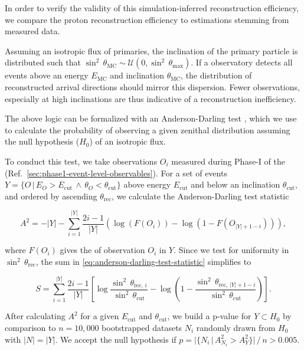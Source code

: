 In order to verify the validity of this simulation-inferred reconstruction 
efficiency, we compare the proton reconstruction efficiency to estimations 
stemming from measured data.

Assuming an isotropic flux of \CR primaries, the inclination of the primary 
particle is distributed such that 
$\sin^2\,\theta_\mathrm{MC} \sim\mathcal{U}(0, \sin^2\,\theta_\mathrm{max})$.
If a \CR observatory detects all events above an energy $E_\mathrm{MC}$ and 
inclination $\theta_\mathrm{MC}$, the distribution of reconstructed arrival
directions should mirror this dispersion. Fewer observations, especially at high
inclinations are thus indicative of a reconstruction inefficiency.

The above logic can be formalized with an Anderson-Darling test
\cite{andersonAsymptoticTheoryCertain1952}, which we use to calculate the 
probability of observing a given zenithal distribution assuming the null 
hypothesis ($H_0$) of an isotropic flux.

To conduct this test, we take observations $O_i$ measured during Phase-I of the
\PAO (Ref.~\cref{sec:phase1-event-level-observables}). For a set of events 
$Y = \{ O\,|\,E_O > E_\mathrm{cut}\,\wedge\,\theta_O < \theta_\mathrm{cut}\}$ 
above energy $E_\mathrm{cut}$ and below an inclination $\theta_\mathrm{cut}$,
and ordered by ascending $\theta_\mathrm{rec}$, we calculate the 
Anderson-Darling test statistic

\begin{equation}
\label{eq:anderson-darling-test-statistic}
A^2 = -|Y| - \sum\limits_{i=1}^{|Y|} \frac{2i-1}{|Y|} \left(\log(F(O_i)) - \log(1 - F(O_{|Y|+1-i}))\right),
\end{equation}

where $F(O_i)$ gives the \CDF of observation $O_i$ in $Y$. Since we test for 
uniformity in $\sin^2\,\theta_\mathrm{rec}$, the sum in 
\cref{eq:anderson-darling-test-statistic} simplifies to

\begin{equation}
\label{eq:anderson-darling-sum}
S = \sum\limits_{i=1}^{|Y|} \frac{2i-1}{|Y|} \left[\log\frac{\sin^2\,\theta_{\mathrm{rec},\,i}}{\sin^2\,\theta_\mathrm{cut}} - \log\left(1-\frac{\sin^2\,\theta_{\mathrm{rec},\,|Y|+1-i}}{\sin^2\,\theta_\mathrm{cut}}\right)\right].
\end{equation}

After calculating $A^2$ for a given $E_\mathrm{cut}$ and $\theta_\mathrm{cut}$,
we build a p-value for $Y\subset H_0$ by comparison to $n=10,000$ bootstrapped 
datasets $N_i$ randomly drawn from $H_0$ with $|N| = |Y|$. We accept the null 
hypothesis if $p = |\{N_i\,|\,A_{N_i}^2 > A_Y^2\}|\,/\,n  > 0.005$.

